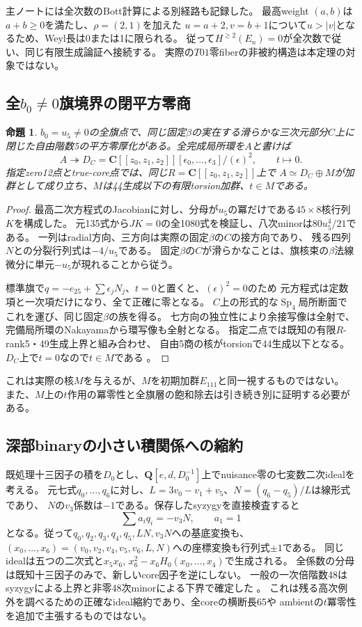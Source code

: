 \documentclass[11pt,a4paper]{ltjsarticle}
\newcommand{\CC}{\mathbf C}
\newcommand{\QQ}{\mathbf Q}
\DeclareMathOperator{\Sp}{Sp}
\newtheorem{proposition}[theorem]{命題}
\theoremstyle{remark}
\begin{document}
主ノートには全次数のBott計算による別経路も記録した。
最高weight $(a,b)$は$a+b\ge0$を満たし、$\rho=(2,1)$を加えた
$u=a+2,v=b+1$について$u>|v|$となるため、Weyl長は0または1に限られる。
従って$H^{\ge2}(E_n)=0$が全次数で従い、同じ有限生成論証へ接続する。
実際の$T01$零fiberの非被約構造は本定理の対象ではない。

\subsection{全$b_0\ne0$旗境界の閉平方零商}
\begin{proposition}
$b_0=u_5\ne0$の全旗点で、同じ固定$\beta$の実在する滑らかな三次元部分$C$上に
閉じた自由階数5の平方零厚化がある。全完成局所環を$A$と書けば
\[
 A\twoheadrightarrow D_C=\CC[[z_0,z_1,z_2]][\epsilon_0,\ldots,\epsilon_3]/(\epsilon)^2,
 \qquad t\longmapsto0.
\]
指定zero12点とtrue-core点では、同じ$R=\CC[[z_0,z_1,z_2]]$上で
$A\simeq D_C\oplus M$が加群として成り立ち、$M$は44生成以下の有限torsion加群、$t\in M$である。
\end{proposition}
\begin{proof}
最高二次方程式のJacobianに対し、分母が$u_5$の冪だけである$45\times8$核行列$K$を構成した。
元135式から$JK=0$の全1080式を検証し、八次minorは$80u_5^4/21$である。
一列はradial方向、三方向は実際の固定$\beta$の$C$の接方向であり、
残る四列$N$との分裂行列式は$-4/u_5$である。
固定$\beta$の$C$が滑らかなことは、旗核束の$\beta$法線微分に単元$-u_5$が現れることから従う。

標準旗で$q=-e_{25}+\sum\epsilon_jN_j$、$t=0$と置くと、$(\epsilon)^2=0$のため
元方程式は定数項と一次項だけになり、全て正確に零となる。
$C$上の形式的な$\Sp_4$局所断面でこれを運び、同じ固定$\beta$の族を得る。
七方向の独立性により余接写像は全射で、完備局所環のNakayamaから環写像も全射となる。
指定二点では既知の有限$R$-rank5・49生成上界と組み合わせ、
自由5商の核がtorsionで44生成以下となる。$D_C$上で$t=0$なので$t\in M$である
\cite{flag-squarezero-v52}。
\end{proof}
これは実際の核$M$を与えるが、$M$を初期加群$E_{111}$と同一視するものではない。
また、$M$上の$t$作用の冪零性と全旗層の飽和除去は引き続き別に証明する必要がある。

\subsection{深部binaryの小さい積関係への縮約}
既処理十三因子の積を$D_0$とし、$\QQ[e,d,D_0^{-1}]$上でnuisance零の七変数二次idealを考える。
元七式$q_0,\ldots,q_6$に対し、$L=3v_0-v_1+v_5$、$N=(q_6-q_5)/L$は線形式であり、
$N$の$v_3$係数は$-1$である。保存したsyzygyを直接検査すると
\[
 \sum a_iq_i=-v_3N,\qquad a_1=1
\]
となる。従って$q_0,q_2,q_3,q_4,q_5,LN,v_3N$への基底変換も、
$(x_0,\ldots,x_6)=(v_0,v_2,v_4,v_5,v_6,L,N)$への座標変換も行列式$\pm1$である。
同じidealは五つの二次式と$x_5x_6$, $x_6^2-x_6H_0(x_0,\ldots,x_4)$で生成される。
全係数の分母は既知十三因子のみで、新しいcore因子を逆にしない。
一般の一次倍階数48はsyzygyによる上界と非零48次minorによる下界で確定した
\cite{binary-pair-v52}。
これは残る高次例外を調べるための正確なideal縮約であり、全coreの横断長65や
ambientの$t$冪零性を追加で主張するものではない。
\end{document}
